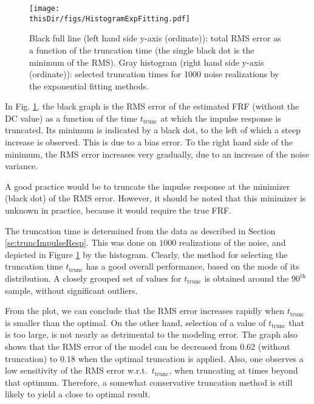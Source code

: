 \begin{figure}[htb] %
   \centering



	\texttt{[image: \\thisDir/figs/HistogramExpFitting.pdf]}
 \caption{Black full line (left hand side y-axis (ordinate)): total RMS error as a function of the truncation time (the single black dot is the minimum of the RMS). Gray histogram (right hand side y-axis (ordinate)): selected truncation times for 1000 noise realizations by the exponential fitting methods.}



   \label{fig:pdfAndRMSeVStruncTime}
\end{figure}

In Fig. \ref{fig:pdfAndRMSeVStruncTime}, the black graph is the RMS error of the estimated FRF (without the DC value) as a function of the time $t_\mathrm{trunc}$ at which the impulse response is truncated. Its minimum is indicated by a black dot, to the left of which a steep increase is observed. This is due to a bias error. To the right hand side of the minimum, the RMS error increases very gradually, due to an increase of the noise variance.

A good practice would be to truncate the impulse response at the minimizer (black dot) of the RMS error. However, it should be noted that this minimizer is unknown in practice, because it would require
the true FRF.

The truncation time is determined from the data as described in Section \ref{se:truncImpulseResp}. This was done on $1000$ realizations of the noise, and depicted in Figure \ref{fig:pdfAndRMSeVStruncTime} by the histogram.
Clearly, the method for selecting the truncation time $t_{\mathrm{trunc}}$ has a good overall performance, based on the mode of its distribution. A closely grouped set of values for $t_{\mathrm{trunc}}$ is obtained around the $90^{\text{th}}$ sample, without significant outliers.


From the plot, we can conclude that the RMS error increases rapidly when $t_{\mathrm{trunc}}$ is smaller than the optimal.
On the other hand, selection of a value of $t_{\mathrm{trunc}}$ that is too large, is not nearly as detrimental to the modeling error.
The graph also shows that the RMS error of the model can be decreased from $0.62$ (without truncation) to $0.18$ when the optimal truncation is applied. Also, one observes a low sensitivity of the RMS error w.r.t.~$t_\mathrm{trunc}$, when truncating at times beyond that optimum. Therefore, a somewhat conservative truncation method is still likely to yield a close to optimal result.

